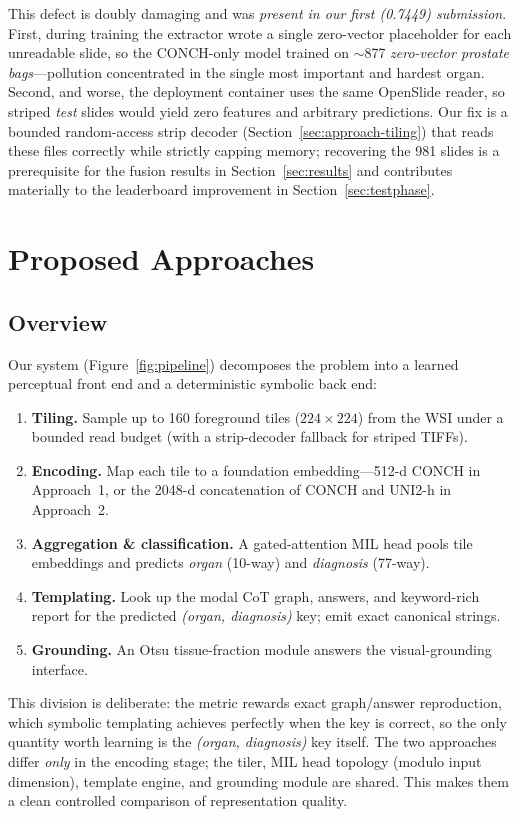 \documentclass[11pt,a4paper]{article}
\begin{document}
This defect is doubly damaging and was \emph{present in our first (0.7449) submission}. First,
during training the extractor wrote a single zero-vector placeholder for each unreadable slide, so
the CONCH-only model trained on $\sim$877 \emph{zero-vector prostate bags}---pollution
concentrated in the single most important and hardest organ. Second, and worse, the deployment
container uses the same OpenSlide reader, so striped \emph{test} slides would yield zero features
and arbitrary predictions. Our fix is a bounded random-access strip decoder
(Section~\ref{sec:approach-tiling}) that reads these files correctly while strictly capping
memory; recovering the 981 slides is a prerequisite for the fusion results in
Section~\ref{sec:results} and contributes materially to the leaderboard improvement in
Section~\ref{sec:testphase}.

\section{Proposed Approaches}
\label{sec:approach}

\subsection{Overview}
Our system (Figure~\ref{fig:pipeline}) decomposes the problem into a learned perceptual front
end and a deterministic symbolic back end:
\begin{enumerate}[leftmargin=1.4em,itemsep=2pt]
  \item \textbf{Tiling.} Sample up to 160 foreground tiles ($224{\times}224$) from the WSI under
        a bounded read budget (with a strip-decoder fallback for striped TIFFs).
  \item \textbf{Encoding.} Map each tile to a foundation embedding---512-d CONCH in
        Approach~1, or the 2048-d concatenation of CONCH and UNI2-h in Approach~2.
  \item \textbf{Aggregation \& classification.} A gated-attention MIL head pools tile
        embeddings and predicts \emph{organ} (10-way) and \emph{diagnosis} (77-way).
  \item \textbf{Templating.} Look up the modal CoT graph, answers, and keyword-rich report for
        the predicted \emph{(organ, diagnosis)} key; emit exact canonical strings.
  \item \textbf{Grounding.} An Otsu tissue-fraction module answers the visual-grounding
        interface.
\end{enumerate}
This division is deliberate: the metric rewards exact graph/answer reproduction, which symbolic
templating achieves perfectly when the key is correct, so the only quantity worth learning is
the \emph{(organ, diagnosis)} key itself. The two approaches differ \emph{only} in the encoding
stage; the tiler, MIL head topology (modulo input dimension), template engine, and grounding
module are shared. This makes them a clean controlled comparison of representation quality.
\end{document}
